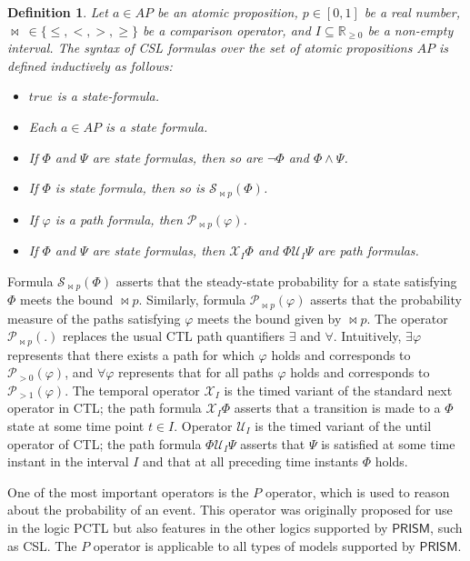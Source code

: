 \documentclass[preprint,12pt]{qrei}
\newtheorem{mydef}{Definition}
\begin{document}
\begin{mydef}\label{def:csl}
Let $a\in AP$ be an atomic proposition, $p\in[0,1]$ be a real number, $\bowtie\ \in\{\leq,<,>,\geq\}$ be a comparison operator, and $I\subseteq\mathbb{R}_{\geq 0}$ be a non-empty interval. The syntax of CSL formulas over the set of atomic propositions $AP$ is defined inductively as follows:
\begin{itemize}
\item $true$ is a state-formula.
\item Each $a\in AP$ is a state formula.
\item If $\Phi$ and $\Psi$ are state formulas, then so are $\neg\Phi$ and $\Phi\wedge\Psi$.
\item If $\Phi$ is state formula, then so is $\mathcal{S}_{\bowtie p}(\Phi)$.
\item If $\varphi$ is a path formula, then $\mathcal{P}_{\bowtie p}(\varphi)$.
\item If $\Phi$ and $\Psi$ are state formulas, then $\mathcal{X}_{I}\Phi$ and $\Phi\mathcal{U}_{I}\Psi$ are path formulas.
\end{itemize}
\end{mydef}

Formula $\mathcal{S}_{\bowtie p}(\Phi)$ asserts that the steady-state probability for a state satisfying $\Phi$ meets the bound $\bowtie p$. Similarly, formula $\mathcal{P}_{\bowtie p}(\varphi)$ asserts that the probability measure of the paths satisfying $\varphi$ meets the bound given by $\bowtie p$. The operator $\mathcal{P}_{\bowtie p}(.)$ replaces the usual CTL path quantifiers $\exists$ and $\forall$. Intuitively, $\exists\varphi$ represents that there exists a path for which $\varphi$ holds and corresponds to $\mathcal{P}_{>0}(\varphi)$, and $\forall\varphi$ represents that for all paths $\varphi$ holds and corresponds to $\mathcal{P}_{>1}(\varphi)$. The temporal operator $\mathcal{X}_{I}$ is the timed variant of the standard next operator in CTL; the path formula $\mathcal{X}_{I}\Phi$ asserts that a transition is made to a $\Phi$ state at some time point $t\in I$. Operator $\mathcal{U}_{I}$ is the timed variant of the until operator of CTL; the path formula $\Phi\mathcal{U}_{I}\Psi$ asserts that $\Psi$ is satisfied at some time instant in the interval $I$ and that at all preceding time instants $\Phi$ holds.

One of the most important operators is the $P$ operator, which is used to reason about the probability of an event. This operator was originally proposed for use in the logic PCTL but also features in the other logics supported by $\mathsf{PRISM}$, such as CSL. The $P$ operator is applicable to all types of models supported by $\mathsf{PRISM}$.
\end{document}
